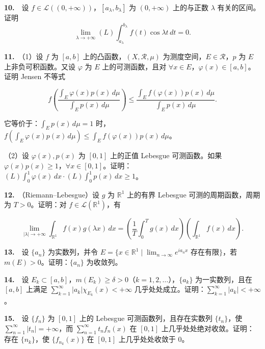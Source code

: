 \documentclass[11pt,a4paper]{article}
\begin{document}
\par{}\hypertarget{review10}{}\noindent \textbf{10.}　设 \(f\in\mathcal L((0,+\infty))\)，\([a_\lambda,b_\lambda]\) 为 \((0,+\infty)\) 上的与正数 \(\lambda\) 有关的区间。证明 \[\lim_{\lambda\to+\infty}(L)\int_{a_\lambda}^{b_\lambda}f(t)\cos\lambda t\,dt=0.\]

\par{}\hypertarget{review11}{}\noindent \textbf{11.}　（1）设 \(f\) 为 \([a,b]\) 上的凸函数，\((X,\mathcal R,\mu)\) 为测度空间，\(E\in\mathcal R\)，\(p\) 为 \(E\) 上非负可积函数。又设 \(\varphi\) 为 \(E\) 上的可测函数，且对 \(\forall x\in E\)，\(\varphi(x)\in[a,b]\)。证明 Jensen 不等式

\[
f\left(\frac{\int_E\varphi(x)p(x)\,d\mu}{\int_Ep(x)\,d\mu}\right)\le\frac{\int_E f(\varphi(x))p(x)\,d\mu}{\int_Ep(x)\,d\mu}.
\]

它等价于：\(\int_Ep(x)\,d\mu=1\) 时，\(f(\int_E\varphi(x)p(x)\,d\mu)\le\int_E f(\varphi(x))p(x)\,d\mu\)。

（2）设 \(\varphi(x),p(x)\) 为 \([0,1]\) 上的正值 Lebesgue 可测函数。如果 \(\varphi(x)p(x)\ge1\)，\(\forall x\in[0,1]\)。证明：\((L)\int_0^1\varphi(x)\,dx\cdot(L)\int_0^1p(x)\,dx\ge1\)。

\par{}\hypertarget{review12}{}\noindent \textbf{12.}　（Riemann--Lebesgue）设 \(g\) 为 \(\mathbb R^1\) 上的有界 Lebesgue 可测的周期函数，周期为 \(T>0\)。证明：对 \(f\in\mathcal L(\mathbb R^1)\)，有

\[
\lim_{|\lambda|\to+\infty}\int_{\mathbb R^1}f(x)g(\lambda x)\,dx=\left(\frac1T\int_0^T g(x)\,dx\right)\left(\int_{\mathbb R^1} f(x)\,dx\right).
\]

\par{}\hypertarget{review13}{}\noindent \textbf{13.}　设 \(\{a_n\}\) 为实数列，并令 \(E=\{x\in\mathbb R^1\mid\lim_{n\to\infty}e^{ia_nx}\text{ 存在有限}\}\)，若 \(m(E)>0\)。证明：\(\{a_n\}\) 为收敛列。

\par{}\hypertarget{review14}{}\noindent \textbf{14.}　设 \(E_k\subset[a,b]\)，\(m(E_k)\ge\delta>0\)（\(k=1,2,\ldots\)），\(\{a_k\}\) 为一实数列，且在 \([a,b]\) 上满足 \(\sum_{k=1}^\infty|a_k|\chi_{E_k}(x)<+\infty\) 几乎处处成立。证明：\(\sum_{k=1}^\infty |a_k|<+\infty\)。

\par{}\hypertarget{review15}{}\noindent \textbf{15.}　设 \(\{f_n\}\) 为 \([0,1]\) 上的 Lebesgue 可测函数列，且存在实数列 \(\{t_n\}\)，使 \(\sum_{n=1}^\infty |t_n|=+\infty\)，而 \(\sum_{n=1}^\infty t_nf_n(x)\) 在 \([0,1]\) 上几乎处处绝对收敛。证明：存在 \(\{n_k\}\)，使 \(\{f_{n_k}(x)\}\) 在 \([0,1]\) 上几乎处处收敛于 \(0\)。
\end{document}

